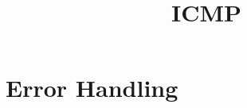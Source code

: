 \documentclass{article}
\title{ICMP}
\begin{document}
\maketitle

\section*{Error Handling}
\end{document}
